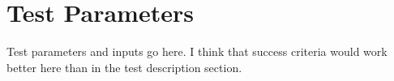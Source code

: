 \section{Test Parameters}

Test parameters and inputs go here. I think that success criteria would work better here than in the test description section.
